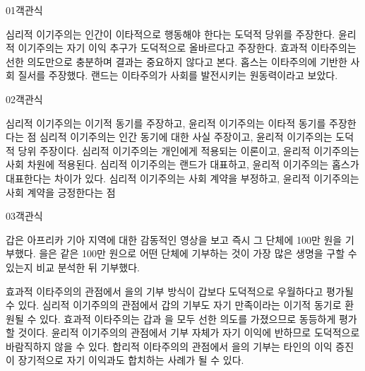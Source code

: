 \documentclass[fs85,seriesWit]{korfarm-base}
\begin{document}
\kfBeginMC
\begin{kfQBlock}{01}{객관식}
\begin{kfChoices}
\kfChoice 심리적 이기주의는 인간이 이타적으로 행동해야 한다는 도덕적 당위를 주장한다.
\kfChoice 윤리적 이기주의는 자기 이익 추구가 도덕적으로 올바르다고 주장한다.
\kfChoice 효과적 이타주의는 선한 의도만으로 충분하며 결과는 중요하지 않다고 본다.
\kfChoice 홉스는 이타주의에 기반한 사회 질서를 주장했다.
\kfChoice 랜드는 이타주의가 사회를 발전시키는 원동력이라고 보았다.
\end{kfChoices}
\end{kfQBlock}

\begin{kfQBlock}{02}{객관식}
\begin{kfChoices}
\kfChoice 심리적 이기주의는 이기적 동기를 주장하고, 윤리적 이기주의는 이타적 동기를 주장한다는 점
\kfChoice 심리적 이기주의는 인간 동기에 대한 사실 주장이고, 윤리적 이기주의는 도덕적 당위 주장이다.
\kfChoice 심리적 이기주의는 개인에게 적용되는 이론이고, 윤리적 이기주의는 사회 차원에 적용된다.
\kfChoice 심리적 이기주의는 랜드가 대표하고, 윤리적 이기주의는 홉스가 대표한다는 차이가 있다.
\kfChoice 심리적 이기주의는 사회 계약을 부정하고, 윤리적 이기주의는 사회 계약을 긍정한다는 점
\end{kfChoices}
\end{kfQBlock}

\begin{kfQBlock}{03}{객관식}
\begin{kfEvidence}갑은 아프리카 기아 지역에 대한 감동적인 영상을 보고 즉시 그 단체에 100만 원을 기부했다. 을은 같은 100만 원으로 어떤 단체에 기부하는 것이 가장 많은 생명을 구할 수 있는지 비교 분석한 뒤 기부했다.\end{kfEvidence}
\begin{kfChoices}
\kfChoice 효과적 이타주의의 관점에서 을의 기부 방식이 갑보다 도덕적으로 우월하다고 평가될 수 있다.
\kfChoice 심리적 이기주의의 관점에서 갑의 기부도 자기 만족이라는 이기적 동기로 환원될 수 있다.
\kfChoice 효과적 이타주의는 갑과 을 모두 선한 의도를 가졌으므로 동등하게 평가할 것이다.
\kfChoice 윤리적 이기주의의 관점에서 기부 자체가 자기 이익에 반하므로 도덕적으로 바람직하지 않을 수 있다.
\kfChoice 합리적 이타주의의 관점에서 을의 기부는 타인의 이익 증진이 장기적으로 자기 이익과도 합치하는 사례가 될 수 있다.
\end{kfChoices}
\end{kfQBlock}
\end{document}
